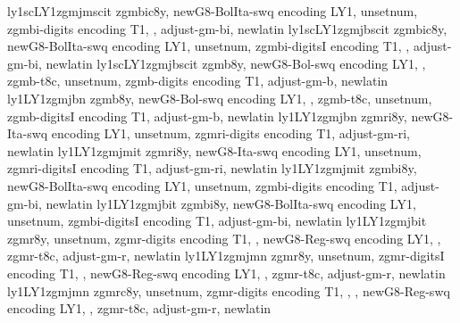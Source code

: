 {ly1sc}{LY1}{zgmj}{m}{scit}{}
%
{zgmbic8y,%
newG8-BolIta-swq encoding LY1,%
unsetnum,%
zgmbi-digits encoding T1,%
\metrics {}  ,%
adjust-gm-bi,%
newlatin}
{ly1sc}{LY1}{zgmj}{b}{scit}{}
%
{zgmbic8y,%
newG8-BolIta-swq encoding LY1,%
unsetnum,%
zgmbi-digitsI encoding T1,%
\metrics {}  ,%
adjust-gm-bi,%
newlatin}
{ly1sc}{LY1}{zgmj}{b}{scit}{}
%
{zgmb8y,%
newG8-Bol-swq encoding LY1,%
\metrics {},%
zgmb-t8c,%
unsetnum,%
zgmb-digits encoding T1,%
adjust-gm-b,%
newlatin}
{ly1}{LY1}{zgmj}{b}{n}{}
%
{zgmb8y,%
newG8-Bol-swq encoding LY1,%
\metrics {},%
zgmb-t8c,%
unsetnum,%
zgmb-digitsI encoding T1,%
adjust-gm-b,%
newlatin}
{ly1}{LY1}{zgmj}{b}{n}{}
%
{zgmri8y,%
newG8-Ita-swq encoding LY1,%
unsetnum,%
zgmri-digits encoding T1,%
adjust-gm-ri,%
newlatin}
{ly1}{LY1}{zgmj}{m}{it}{}
%
{zgmri8y,%
newG8-Ita-swq encoding LY1,%
unsetnum,%
zgmri-digitsI encoding T1,%
adjust-gm-ri,%
newlatin}
{ly1}{LY1}{zgmj}{m}{it}{}
%
{zgmbi8y,%
newG8-BolIta-swq encoding LY1,%
unsetnum,%
zgmbi-digits encoding T1,%
adjust-gm-bi,%
newlatin}
{ly1}{LY1}{zgmj}{b}{it}{}
%
{zgmbi8y,%
newG8-BolIta-swq encoding LY1,%
unsetnum,%
zgmbi-digitsI encoding T1,%
adjust-gm-bi,%
newlatin}
{ly1}{LY1}{zgmj}{b}{it}{}
%
{zgmr8y,%
unsetnum,%
zgmr-digits encoding T1,%
\metrics {},%
newG8-Reg-swq encoding LY1,%
\metrics {},%
zgmr-t8c,%
adjust-gm-r,%
newlatin}
{ly1}{LY1}{zgmj}{m}{n}{}
%
{zgmr8y,%
unsetnum,%
zgmr-digitsI encoding T1,%
\metrics {},%
newG8-Reg-swq encoding LY1,%
\metrics {},%
zgmr-t8c,%
adjust-gm-r,%
newlatin}
{ly1}{LY1}{zgmj}{m}{n}{}
%
{zgmrc8y,%
unsetnum,%
zgmr-digits encoding T1,%
\metrics {}  ,%
\metrics {},%
newG8-Reg-swq encoding LY1,%
\metrics {},%
zgmr-t8c,%
adjust-gm-r,%
newlatin}
